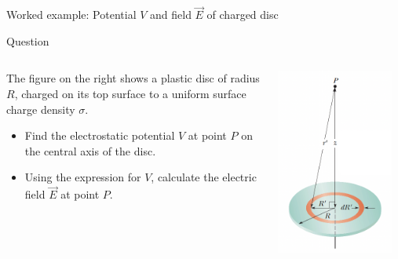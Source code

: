 {
\problemslide

\begin{frame}{Worked example: Potential $V$ and field $\vec{E}$ of charged disc}

  \begin{blockexmplque}{Question}
    \begin{columns}
      \begin{column}{0.60\textwidth}
        The figure on the right shows a plastic disc of radius $R$,
        charged on its top surface to a uniform surface charge density $\sigma$.
        \begin{itemize}
        \item
        Find the electrostatic potential $V$ at point $P$ on the
        central axis of the disc.
        \item
        Using the expression for $V$, calculate
        the electric field $\vec{E}$ at point $P$.
        \end{itemize}
      \end{column}
      \begin{column}{0.40\textwidth}
        \begin{center}
          \includegraphics[width=0.92\textwidth]{./images/problems/lect03_charged_disk_3}\\
        \end{center}
      \end{column}
    \end{columns}
  \end{blockexmplque}


\end{frame}}
